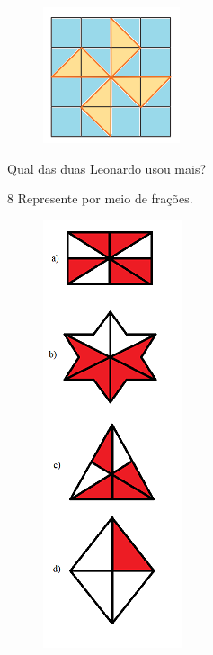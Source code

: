 \begin{figure}[H]
\includegraphics[width=1.58333in,height=1.57292in]{./imgSAEB_6_MAT/media/image33.png}
\end{figure}

Qual das duas Leonardo usou mais?


\num{8}  Represente por meio de frações.

\begin{figure}
\includegraphics[width=1.61458in,height=4.94792in]{./imgSAEB_6_MAT/media/image34.png}
\end{figure}

\begin{escolha}
\item {}
\item {}
\item {}
\item {}
\end{escolha}

